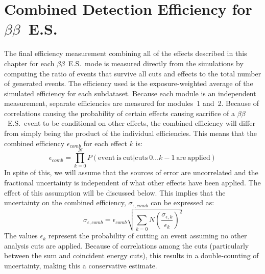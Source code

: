 \documentclass[notitlepage,rmp,aps,10pt]{revtex4-1}
\newcommand{\bb}{${\beta \beta}$}
\newcommand{\bbes}{\bb~E.S.}
\begin{document}
\section{Combined Detection Efficiency for \bbes}
The final efficiency measurement combining all of the effects described in this chapter for each \bbes\ mode is measured directly from the simulations by computing the ratio of events that survive all cuts and effects to the total number of generated events.
The efficiency used is the exposure-weighted average of the simulated efficiency for each subdataset.
Because each module is an independent measurement, separate efficiencies are measured for modules~1 and~2.
Because of correlations causing the probability of certain effects causing sacrifice of a \bbes\ event to be conditional on other effects, the combined efficiency will differ from simply being the product of the individual efficiencies.
This means that the combined efficiency $\epsilon_{comb}$ for each effect $k$ is:
\begin{equation}
  \epsilon_{comb} = \prod_{k=0}^N P(\mathrm{event~is~cut} | \mathrm{cuts~} 0\dots k-1 \mathrm{~are~applied})
\end{equation}
In spite of this, we will assume that the sources of error are uncorrelated and the fractional uncertainty is independent of what other effects have been applied.
The effect of this assumption will be discussed below.
This implies that the uncertainty on the combined efficiency, $\sigma_{\epsilon,comb}$ can be expressed as:
\begin{equation}
  \sigma_{\epsilon,comb}=\epsilon_{comb} \sqrt{ \sum_{k=0}{N} (\frac{\sigma_{\epsilon,k}}{\epsilon_k})^2 }
\end{equation}
The values $\epsilon_k$ represent the probability of cutting an event assuming no other analysis cuts are applied.
Because of correlations among the cuts (particularly between the sum and coincident energy cuts), this results in a double-counting of uncertainty, making this a conservative estimate.
\end{document}
